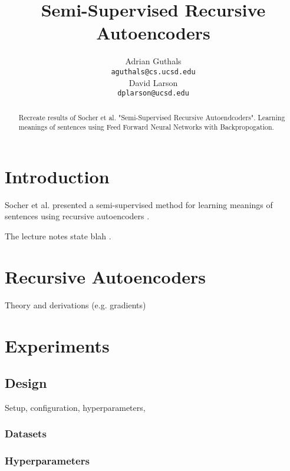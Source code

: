 \documentclass{article}
\title{Semi-Supervised Recursive Autoencoders}
\author{
Adrian Guthals \\
\texttt{aguthals@cs.ucsd.edu} \\
\And
David Larson \\
\texttt{dplarson@ucsd.edu} \\
}
\begin{document}
\maketitle


\begin{abstract}
Recreate results of Socher et al. "Semi-Supervised Recursive Autoendcoders". Learning meanings of sentences using Feed Forward Neural Networks with Backpropogation.
\end{abstract}



\section{Introduction}

Socher et al. presented a semi-supervised method for learning meanings of sentences using recursive autoencoders \cite{Socher}.

The lecture notes state blah \cite{CSE250B}.


\section{Recursive Autoencoders}
Theory and derivations (e.g. gradients)


\section{Experiments}


%
%
\subsection{Design}
Setup, configuration, hyperparameters, 

\subsubsection{Datasets}

\subsubsection{Hyperparameters}
\end{document}
